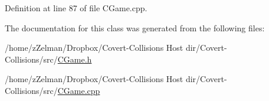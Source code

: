 Definition at line 87 of file C\-Game.\-cpp.



The documentation for this class was generated from the following files\-:\begin{DoxyCompactItemize}
\item 
/home/z\-Zelman/\-Dropbox/\-Covert-\/\-Collisions Host dir/\-Covert-\/\-Collisions/src/\hyperlink{CGame_8h}{C\-Game.\-h}\item 
/home/z\-Zelman/\-Dropbox/\-Covert-\/\-Collisions Host dir/\-Covert-\/\-Collisions/src/\hyperlink{CGame_8cpp}{C\-Game.\-cpp}\end{DoxyCompactItemize}
